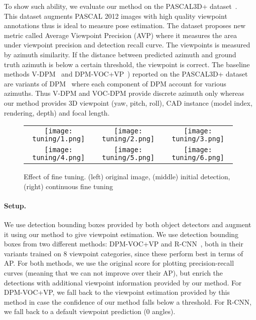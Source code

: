 To show such ability, we evaluate our method on the PASCAL3D+
dataset~\cite{Xiang14}. This dataset augments PASCAL 2012 images with
high quality viewpoint annotations thus is ideal to measure pose
estimation. The dataset proposes new metric called Average Viewpoint
Precision (AVP) where it measures the area under viewpoint precision
and detection recall curve. The viewpoints is measured by azimuth
similarity. If the distance between predicted azimuth and ground truth
azimuth is below a certain threshold, the viewpoint is correct.
The baseline methods V-DPM~\cite{Xiang14} and
DPM-VOC+VP~\cite{Pepik12}) reported on the PASCAL3D+ dataset are
variants of DPM~\cite{Felzenszwalb10} where each component of DPM
account for various azimuths. Thus V-DPM and VOC-DPM provide discrete
azimuth only whereas our method provides 3D viewpoint (yaw, pitch,
roll), CAD instance (model index, rendering, depth) and focal length.
%
\begin{figure}[t]
 \begin{center}
    \setlength\tabcolsep{0pt}
    \begin{tabular}{ccc}
   \texttt{[image: tuning/1.png]} &
   \texttt{[image: tuning/2.png]} &
   \texttt{[image: tuning/3.png]} \\[-5pt]
   \texttt{[image: tuning/4.png]} &
   \texttt{[image: tuning/5.png]} &
   \texttt{[image: tuning/6.png]} \\[-5pt]
   \end{tabular}
 \end{center}
 \caption{Effect of fine tuning. (left) original image, (middle) initial detection, (right) continuous fine tuning}
 \label{fig:tuning}
\end{figure}

\paragraph{Setup.}
We use detection bounding boxes provided by both object detectors and
augment it using our method to give viewpoint estimation. We use
detection bounding boxes from two different methods:
DPM-VOC+VP\cite{Pepik12} and R-CNN~\cite{Girshick14}, both in their
variants trained on 8 viewpoint categories, since these perform best
in terms of AP. For both methods,
we use the original score for plotting precision-recall curves
(meaning that we can not improve over their AP), but
enrich the detections with additional viewpoint information provided
by our method. For DPM-VOC+VP, we fall back to the viewpoint
estimation provided by this method in case the confidence of our
method falls below a threshold. For R-CNN, we fall back to a default
viewpoint prediction ($0$ angles).

